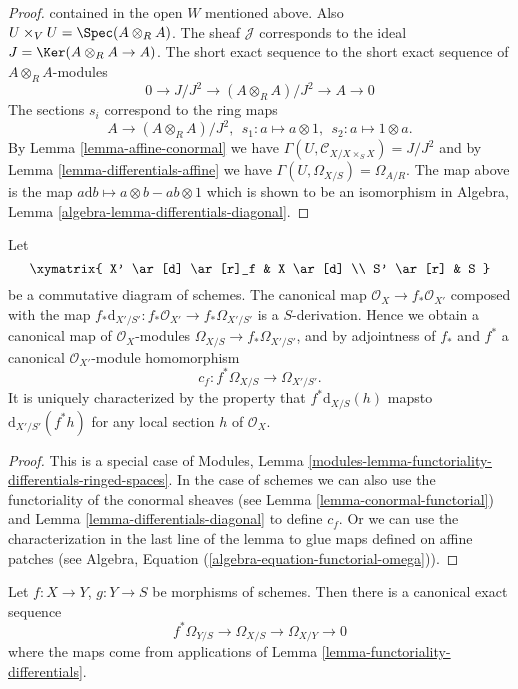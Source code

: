\begin{proof}
contained in the open $W$ mentioned above. Also
$U \times_V U = \Spec(A \otimes_R A)$.
The sheaf $\mathcal{J}$ corresponds to the ideal
$J = \Ker(A \otimes_R A \to A)$.
The short exact sequence to the short exact sequence
of $A \otimes_R A$-modules
$$
0 \to J/J^2 \to (A \otimes_R A)/J^2 \to A \to 0
$$
The sections $s_i$ correspond to the ring maps
$$
A \longrightarrow (A \otimes_R A)/J^2, \ \
s_1 : a \mapsto a \otimes 1, \ \
s_2 : a \mapsto 1 \otimes a.
$$
By Lemma \ref{lemma-affine-conormal} we have
$\Gamma(U, \mathcal{C}_{X/X \times_S X}) = J/J^2$ and
by Lemma \ref{lemma-differentials-affine}
we have $\Gamma(U, \Omega_{X/S}) = \Omega_{A/R}$.
The map above is the map $a \text{d}b \mapsto a \otimes b - ab \otimes 1$
which is shown to be an isomorphism in
Algebra, Lemma \ref{algebra-lemma-differentials-diagonal}.
\end{proof}

\begin{lemma}
\label{lemma-functoriality-differentials}
Let
$$
\xymatrix{
X' \ar[d] \ar[r]_f & X \ar[d] \\
S' \ar[r] & S
}
$$
be a commutative diagram of schemes. The canonical map
$\mathcal{O}_X \to f_*\mathcal{O}_{X'}$ composed with the map
$f_*\text{d}_{X'/S'} : f_*\mathcal{O}_{X'} \to f_*\Omega_{X'/S'}$ is a
$S$-derivation. Hence we obtain a canonical map of $\mathcal{O}_X$-modules
$\Omega_{X/S} \to f_*\Omega_{X'/S'}$, and by
adjointness of $f_*$ and $f^*$ a
canonical $\mathcal{O}_{X'}$-module homomorphism
$$
c_f : f^*\Omega_{X/S} \longrightarrow \Omega_{X'/S'}.
$$
It is uniquely characterized by the property that
$f^*\text{d}_{X/S}(h)$ mapsto $\text{d}_{X'/S'}(f^* h)$
for any local section $h$ of $\mathcal{O}_X$.
\end{lemma}

\begin{proof}
This is a special case of
Modules, Lemma \ref{modules-lemma-functoriality-differentials-ringed-spaces}.
In the case of schemes we can also use the functoriality of
the conormal sheaves (see Lemma \ref{lemma-conormal-functorial}) and
Lemma \ref{lemma-differentials-diagonal} to define $c_f$.
Or we can use the characterization in the last line of the lemma to
glue maps defined on affine patches
(see Algebra, Equation (\ref{algebra-equation-functorial-omega})).
\end{proof}

\begin{lemma}
\label{lemma-triangle-differentials}
Let $f : X \to Y$, $g : Y \to S$ be morphisms of schemes.
Then there is a canonical exact sequence
$$
f^*\Omega_{Y/S} \to \Omega_{X/S} \to \Omega_{X/Y} \to 0
$$
where the maps come from applications of
Lemma \ref{lemma-functoriality-differentials}.
\end{lemma}

